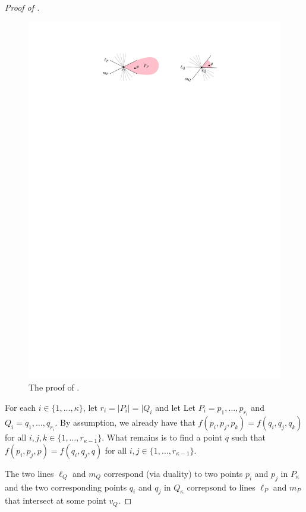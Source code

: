 \documentclass{patmorin}
\begin{document}
\begin{proof}[Proof of ]
   \begin{figure}
      \begin{center}
         \includegraphics{figs/main-lemma}
      \end{center}
      \caption{The proof of .}
   \end{figure}

   For each $i\in \{1,\ldots,\kappa\}$, let $r_i=|P_i|=|Q_i$ and let
   Let $P_{i}=p_1,\ldots,p_{r_i}$ and $Q_{i}=q_1,\ldots,q_{r_i}$.
   By assumption, we already have that $f(p_i,p_j,p_k)=f(q_i,q_j,q_k)$
   for all $i,j,k\in \{1,\ldots,r_{\kappa-1}\}$.  What remains is to
   find a point $q$ such that $f(p_i,p_j,p) = f(q_i,q_j, q)$ for all
   $i,j\in\{1,\ldots,r_{\kappa-1}\}$.

   The two lines $\ell_Q$ and $m_Q$ correspond (via duality) to two
   points $p_i$ and $p_j$ in $P_{\kappa}$ and the two corresponding
   points $q_i$ and $q_j$ in $Q_{\kappa}$ correpsond to lines $\ell_P$
   and $m_P$ that intersect at some point $v_Q$.


\end{proof}
\end{document}
